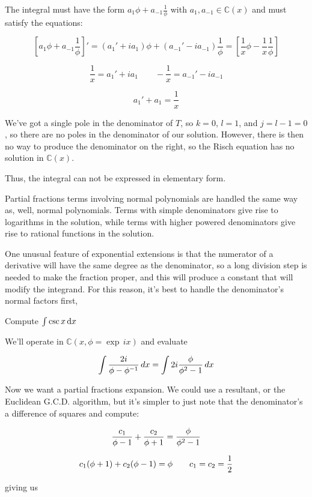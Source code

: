 The integral must have the form $a_1 \phi + a_{-1} \frac{1}{\phi}$
with $a_1, a_{-1} \in {\mathbb C}(x)$ and must satisfy the equations:

$$\left[ a_1 \phi + a_{-1}\frac{1}{\phi} \right]' = (a_1' + i a_1 ) \phi + (a_{-1}' - i a_{-1} ) \frac{1}{\phi}
= \left[ \frac{1}{x}\phi - \frac{1}{x}\frac{1}{\phi} \right]$$

$$\frac{1}{x} = a_1' + i a_1 \qquad - \frac{1}{x} = a_{-1}' - i a_{-1}$$

$$a_1' + a_1 = \frac{1}{x}$$

We've got a single pole in the denominator of $T$, so $k=0$, $l=1$,
and $j=l-1=0$, so there are no poles in the denominator of our solution.
However, there is then no way to produce the denominator on the
right, so the Risch equation has no solution in ${\mathbb C}(x)$.


Thus, the integral can not be expressed in elementary form.

\endexample

\vfil\eject

Partial fractions terms involving normal polynomials are handled the
same way as, well, normal polynomials.  Terms with simple denominators
give rise to logarithms in the solution, while terms with higher
powered denominators give rise to rational functions in the solution.

One unusual feature of exponential extensions is that the numerator of
a derivative will have the same degree as the denominator, so a long
division step is needed to make the fraction proper, and this will
produce a constant that will modify the integrand.  For this reason,
it's best to handle the denominator's normal factors first,


\example Compute $\int \csc x \, {\rm d}x$

We'll operate in ${\mathbb C}(x, \phi = \exp \,ix)$ and evaluate

$$\int {{2i}\over{\phi - \phi^{-1}}} \,dx = \int 2i {{\phi}\over{\phi^2 - 1}} \,dx$$

Now we want a partial fractions expansion.  We could use a resultant,
or the Euclidean G.C.D. algorithm, but it's simpler to just note that
the denominator's a difference of squares and compute:

$${{c_1}\over{\phi-1}} + {{c_2}\over{\phi+1}} = {{\phi}\over{\phi^2-1}} $$

$${{c_1}(\phi+1)} + {{c_2}(\phi-1)} = \phi \qquad c_1 = c_2 = {1\over2} $$

giving us

